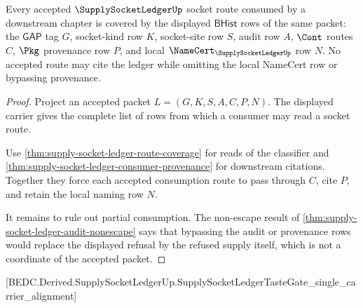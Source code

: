 \begin{theorem}
\label{thm:supply-socket-ledger-consumption-coverage}
Every accepted $\SupplySocketLedgerUp$ socket route consumed by a downstream
chapter is covered by the displayed $\mathsf{BHist}$ rows of the same packet:
the $\mathsf{GAP}$ tag $G$, socket-kind row $K$, socket-site row $S$, audit row
$A$, $\Cont$ routes $C$, $\Pkg$ provenance row $P$, and local
$\NameCert_{\SupplySocketLedgerUp}$ row $N$. No accepted route may cite the
ledger while omitting the local NameCert row or bypassing provenance.
\end{theorem}
\begin{proof}
Project an accepted packet $L=(G,K,S,A,C,P,N)$. The displayed carrier gives
the complete list of rows from which a consumer may read a socket route.

Use \autoref{thm:supply-socket-ledger-route-coverage} for reads of the
classifier and \autoref{thm:supply-socket-ledger-consumer-provenance} for
downstream citations. Together they force each accepted consumption route to
pass through $C$, cite $P$, and retain the local naming row $N$.

It remains to rule out partial consumption. The non-escape result of
\autoref{thm:supply-socket-ledger-audit-nonescape} says that bypassing the
audit or provenance rows would replace the displayed refusal by the refused
supply itself, which is not a coordinate of the accepted packet.
\end{proof}

[BEDC.Derived.SupplySocketLedgerUp.SupplySocketLedgerTasteGate\_single\_carrier\_alignment]


